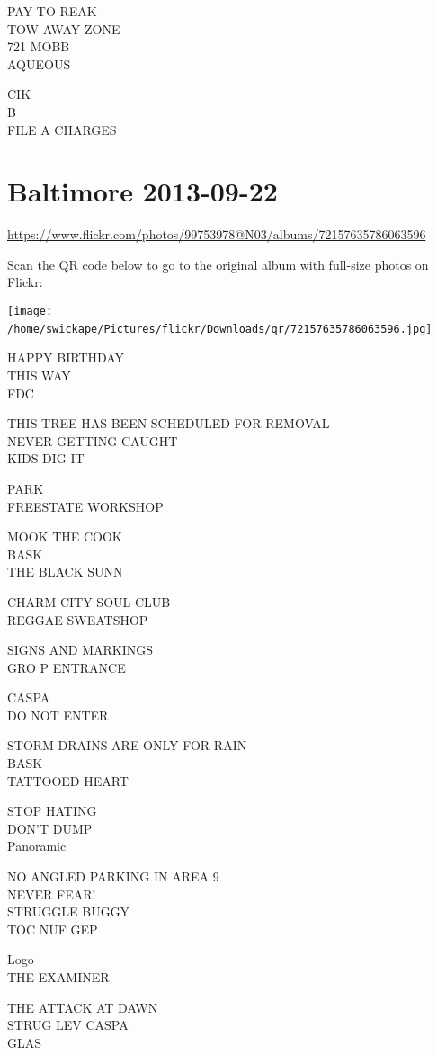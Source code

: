 \documentclass[10pt,letterpaper]{article}
\begin{document}
PAY TO REAK\\
TOW AWAY ZONE\\
721 MOBB\\
AQUEOUS

CIK\\
B\\
FILE A CHARGES
\

\section*{Baltimore 2013-09-22}

\url{https://www.flickr.com/photos/99753978@N03/albums/72157635786063596}

Scan the QR code below to go to the original album with full-size photos on Flickr:

\texttt{[image: /home/swickape/Pictures/flickr/Downloads/qr/72157635786063596.jpg]}
\

HAPPY BIRTHDAY\\
THIS WAY\\
FDC

THIS TREE HAS BEEN SCHEDULED FOR REMOVAL\\
NEVER GETTING CAUGHT\\
KIDS DIG IT

PARK\\
FREESTATE WORKSHOP

MOOK THE COOK\\
BASK\\
THE BLACK SUNN

CHARM CITY SOUL CLUB\\
REGGAE SWEATSHOP

SIGNS AND MARKINGS\\
GRO P ENTRANCE

CASPA\\
DO NOT ENTER

STORM DRAINS ARE ONLY FOR RAIN\\
BASK\\
TATTOOED HEART

STOP HATING\\
DON'T DUMP\\
Panoramic

NO ANGLED PARKING IN AREA 9\\
NEVER FEAR!\\
STRUGGLE BUGGY\\
TOC NUF GEP

Logo\\
THE EXAMINER

THE ATTACK AT DAWN\\
STRUG LEV CASPA\\
GLAS
\end{document}
